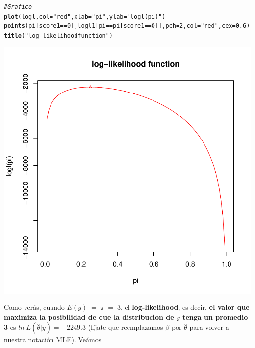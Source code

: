 \documentclass[onesided]{article}\usepackage[]{graphicx}\usepackage[]{color}
\makeatletter
\def\maxwidth{ %
  \ifdim\Gin@nat@width>\linewidth
    \linewidth
  \else
    \Gin@nat@width
  \fi
}
\newcommand{\hlnum}[1]{\textcolor[rgb]{0.686,0.059,0.569}{#1}}%
\newcommand{\hlstr}[1]{\textcolor[rgb]{0.192,0.494,0.8}{#1}}%
\newcommand{\hlcom}[1]{\textcolor[rgb]{0.678,0.584,0.686}{\textit{#1}}}%
\newcommand{\hlopt}[1]{\textcolor[rgb]{0,0,0}{#1}}%
\newcommand{\hlstd}[1]{\textcolor[rgb]{0.345,0.345,0.345}{#1}}%
\newcommand{\hlkwc}[1]{\textcolor[rgb]{0.333,0.667,0.333}{#1}}%
\newcommand{\hlkwd}[1]{\textcolor[rgb]{0.737,0.353,0.396}{\textbf{#1}}}%
\newenvironment{kframe}{%
 \def\at@end@of@kframe{}%
 \ifinner\ifhmode%
  \def\at@end@of@kframe{\end{minipage}}%
  \begin{minipage}{\columnwidth}%
 \fi\fi%
 \def\FrameCommand##1{\hskip\@totalleftmargin \hskip-\fboxsep
 \colorbox{shadecolor}{##1}\hskip-\fboxsep
     \hskip-\linewidth \hskip-\@totalleftmargin \hskip\columnwidth}%
 \MakeFramed {\advance\hsize-\width
   \@totalleftmargin\z@ \linewidth\hsize
   \@setminipage}}%
 {\par\unskip\endMakeFramed%
 \at@end@of@kframe}
\newenvironment{knitrout}{}{} %
\makeatother
\begin{document}
\begin{knitrout}
\color{fgcolor}\begin{kframe}
\begin{alltt}
\hlcom{# Grafico}
\hlkwd{plot}\hlstd{(logl,} \hlkwc{col}\hlstd{=}\hlstr{"red"}\hlstd{,}\hlkwc{xlab}\hlstd{=}\hlstr{"pi"}\hlstd{,}\hlkwc{ylab}\hlstd{=}\hlstr{"logl(pi)"}\hlstd{)}
\hlkwd{points}\hlstd{(pi[score1}\hlopt{==}\hlnum{0}\hlstd{],logl1[pi}\hlopt{==}\hlstd{pi[score1}\hlopt{==}\hlnum{0}\hlstd{]],}\hlkwc{pch}\hlstd{=}\hlnum{2}\hlstd{,}\hlkwc{col}\hlstd{=}\hlstr{"red"}\hlstd{,}\hlkwc{cex}\hlstd{=}\hlnum{0.6}\hlstd{)}
\hlkwd{title}\hlstd{(}\hlstr{"log-likelihood function"}\hlstd{)}
\end{alltt}
\end{kframe}

{\centering \includegraphics[width=\maxwidth]{figure/ll:p-1} 

}



\end{knitrout}

Como ver\'as, cuando $E(y) \;=\; \pi  \;=\; 3$, el {\bf log-likelihood}, es decir, {\bf el valor que maximiza la posibilidad de que la distribucion de $y$ tenga un promedio 3} es $ln \; L(\hat\theta|y)$ = $-2249.3$ (f\'ijate que reemplazamos $\beta$ por $\hat\theta$ para volver a nuestra notaci\'on MLE). Ve\'amos:
\end{document}

